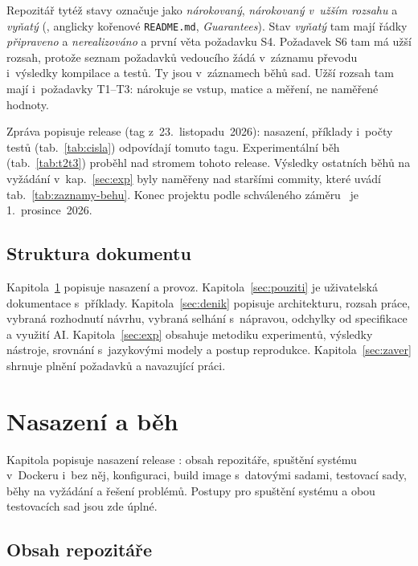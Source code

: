 Repozitář tytéž stavy označuje jako \emph{nárokovaný}, \emph{nárokovaný v~užším rozsahu} a \emph{vyňatý} (, anglicky kořenové \texttt{README.md}, \emph{Guarantees}). Stav \emph{vyňatý} tam mají řádky \emph{připraveno} a \emph{nerealizováno} a první věta požadavku S4. Požadavek S6 tam má užší rozsah, protože seznam požadavků vedoucího žádá v~záznamu převodu i~výsledky kompilace a testů. Ty jsou v~záznamech běhů sad. Užší rozsah tam mají i~požadavky T1--T3: nárokuje se vstup, matice a měření, ne naměřené hodnoty.

Zpráva popisuje release \texttt{\Vydani} (tag z~23.~listopadu~2026): nasazení, příklady i~počty testů (tab.~\ref{tab:cisla}) odpovídají tomuto tagu. Experimentální běh (tab.~\ref{tab:t2t3}) proběhl nad stromem tohoto release. Výsledky ostatních běhů na vyžádání v~kap.~\ref{sec:exp} byly naměřeny nad staršími commity, které uvádí tab.~\ref{tab:zaznamy-behu}. Konec projektu podle schváleného záměru~\cite{zamer} je 1.~prosince~2026.

\subsection{Struktura dokumentu}

Kapitola~\ref{sec:nasazeni} popisuje nasazení a provoz. Kapitola~\ref{sec:pouziti} je uživatelská dokumentace s~příklady. Kapitola~\ref{sec:denik} popisuje architekturu, rozsah práce, vybraná rozhodnutí návrhu, vybraná selhání s~nápravou, odchylky od specifikace a využití AI. Kapitola~\ref{sec:exp} obsahuje metodiku experimentů, výsledky nástroje, srovnání s~jazykovými modely a postup reprodukce. Kapitola~\ref{sec:zaver} shrnuje plnění požadavků a navazující práci.

\section{Nasazení a běh}\label{sec:nasazeni}

Kapitola popisuje nasazení release \texttt{\Vydani}: obsah repozitáře, spuštění systému v~Dockeru i~bez něj, konfiguraci, build image s~datovými sadami, testovací sady, běhy na vyžádání a řešení problémů. Postupy pro spuštění systému a obou testovacích sad jsou zde úplné.

\subsection{Obsah repozitáře}\label{sec:repozitar}

